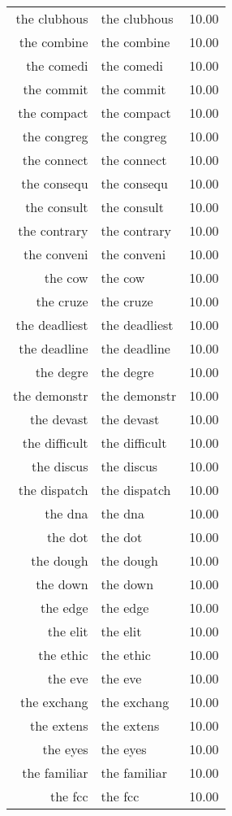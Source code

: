 \begin{table}[ht]
\begin{tabular}{rlr}
  the clubhous & the clubhous & 10.00 \\ 
  the combine & the combine & 10.00 \\ 
  the comedi & the comedi & 10.00 \\ 
  the commit & the commit & 10.00 \\ 
  the compact & the compact & 10.00 \\ 
  the congreg & the congreg & 10.00 \\ 
  the connect & the connect & 10.00 \\ 
  the consequ & the consequ & 10.00 \\ 
  the consult & the consult & 10.00 \\ 
  the contrary & the contrary & 10.00 \\ 
  the conveni & the conveni & 10.00 \\ 
  the cow & the cow & 10.00 \\ 
  the cruze & the cruze & 10.00 \\ 
  the deadliest & the deadliest & 10.00 \\ 
  the deadline & the deadline & 10.00 \\ 
  the degre & the degre & 10.00 \\ 
  the demonstr & the demonstr & 10.00 \\ 
  the devast & the devast & 10.00 \\ 
  the difficult & the difficult & 10.00 \\ 
  the discus & the discus & 10.00 \\ 
  the dispatch & the dispatch & 10.00 \\ 
  the dna & the dna & 10.00 \\ 
  the dot & the dot & 10.00 \\ 
  the dough & the dough & 10.00 \\ 
  the down & the down & 10.00 \\ 
  the edge & the edge & 10.00 \\ 
  the elit & the elit & 10.00 \\ 
  the ethic & the ethic & 10.00 \\ 
  the eve & the eve & 10.00 \\ 
  the exchang & the exchang & 10.00 \\ 
  the extens & the extens & 10.00 \\ 
  the eyes & the eyes & 10.00 \\ 
  the familiar & the familiar & 10.00 \\ 
  the fcc & the fcc & 10.00 \\ 

\end{tabular}
\end{table}
